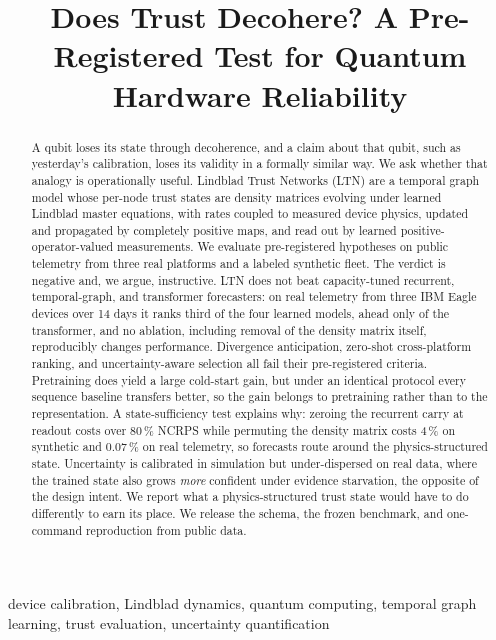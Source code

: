 \documentclass[journal]{IEEEtran}
\title{Does Trust Decohere? A Pre-Registered Test for Quantum Hardware Reliability}
\author{
\IEEEauthorblockN{Muhammad Usman\textsuperscript{*}\thanks{\textsuperscript{*}Corresponding author.}, Yugyung Lee\\}
\IEEEauthorblockA{
Department of Computer Science,
University of Missouri--Kansas City
5100 Rockhill Road, Kansas City, MO 64110, USA\\
\textsuperscript{*}{mucbp@umkc.edu}
}
}
\begin{document}
\maketitle

\begin{abstract}
A qubit loses its state through decoherence, and a claim about that qubit, such as
yesterday's calibration, loses its validity in a formally similar way. We ask
whether that analogy is operationally useful. Lindblad Trust Networks (LTN) are a
temporal graph model whose per-node trust states are density matrices evolving under
learned Lindblad master equations, with rates coupled to measured device physics,
updated and propagated by completely positive maps, and read out by learned
positive-operator-valued measurements. We evaluate pre-registered hypotheses on
public telemetry from three real platforms and a labeled synthetic fleet. The verdict
is negative and, we argue, instructive. LTN does not beat capacity-tuned recurrent,
temporal-graph, and transformer forecasters: on real telemetry from three IBM Eagle
devices over 14 days it ranks third of the four learned models, ahead only of the transformer, and no ablation, including
removal of the density matrix itself, reproducibly changes performance. Divergence anticipation, zero-shot cross-platform
ranking, and uncertainty-aware selection all fail their pre-registered criteria.
Pretraining does yield a large cold-start gain, but under an identical protocol every
sequence baseline transfers better, so the gain belongs to pretraining rather than to
the representation. A state-sufficiency test explains why: zeroing the recurrent carry
at readout costs over 80\,\% NCRPS while permuting the density matrix costs 4\,\% on
synthetic and 0.07\,\% on real telemetry, so forecasts route around the
physics-structured state. Uncertainty is calibrated in
simulation but under-dispersed on real data, where the trained state also grows
\emph{more} confident under evidence starvation, the opposite of the design intent. We report
what a physics-structured trust state would have to do differently to earn its place.
We release the schema, the frozen benchmark, and one-command reproduction from
public data.
\end{abstract}

\begin{IEEEkeywords}
device calibration, Lindblad dynamics, quantum computing, temporal graph learning, trust evaluation, uncertainty quantification
\end{IEEEkeywords}
\end{document}
